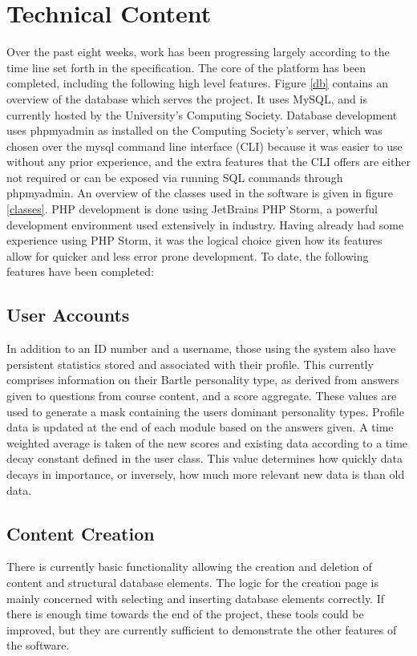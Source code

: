 \documentclass[10pt,a4paper]{report}
\begin{document}
\section*{Technical Content}
Over the past eight weeks, work has been progressing largely according to the time line set forth in the specification. The core of the platform has been completed, including the following high level features. Figure \ref{db} contains an overview of the database which serves the project. It uses MySQL, and is currently hosted by the University's Computing Society. Database development uses phpmyadmin as installed on the Computing Society's server, which was chosen over the mysql command line interface (CLI) because it was easier to use without any prior experience, and the extra features that the CLI offers are either not required or can be exposed via running SQL commands through phpmyadmin. An overview of the classes used in the software is given in figure \ref{classes}.  PHP development is done using JetBrains PHP Storm, a powerful development environment used extensively in industry. Having already had some experience using PHP Storm, it was the logical choice given how its features allow for quicker and less error prone development. To date, the following features have been completed:

\subsection*{User Accounts}
In addition to an ID number and a username, those using the system also have persistent statistics stored and associated with their profile. This currently comprises information on their Bartle personality type, as derived from answers given to questions from course content, and a score aggregate. These values are used to generate a mask containing the users dominant personality types. Profile data is updated at the end of each module based on the answers given. A time weighted average is taken of the new scores and existing data according to a time decay constant defined in the user class. This value determines how quickly data decays in importance, or inversely, how much more relevant new data is than old data.

\subsection*{Content Creation}
There is currently basic functionality allowing the creation and deletion of content and structural database elements. The logic for the creation page is mainly concerned with selecting and inserting database elements correctly. If there is enough time towards the end of the project, these tools could be improved, but they are currently sufficient to demonstrate the other features of the software.
\end{document}
